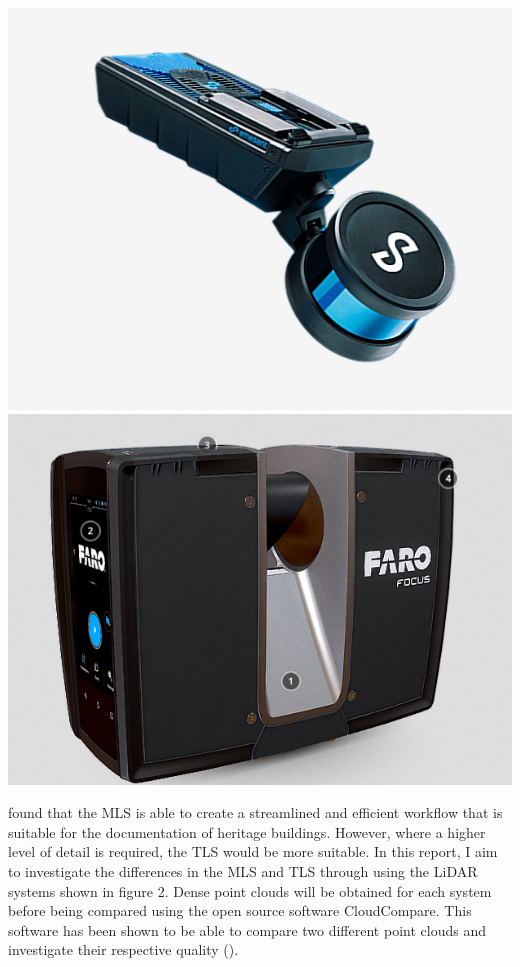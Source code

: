 \documentclass[man]{apa7}
\begin{document}
\begin{minipage}{\linewidth}
  \includegraphics[height=\textheight/3,width=\textwidth/2]{figures/HoverMap.png}
  \includegraphics[height=\textheight/3,width=\textwidth/2]{figures/FaroFocus.png}
  \label{fig:TLSandMLS}
\end{minipage}



\Textcite{conti2024} found that the MLS is able to create a streamlined and efficient workflow that is suitable for the documentation of heritage buildings. However, where a higher level of detail is required, the TLS would be more suitable. In this report, I aim to investigate the differences in the MLS and TLS through using the LiDAR systems shown in figure 2. Dense point clouds will be obtained for each system before being compared using the open source software CloudCompare. This software has been shown to be able to compare two different point clouds and investigate their respective quality (\Textcite{girardeau2016}). 
\end{document}
